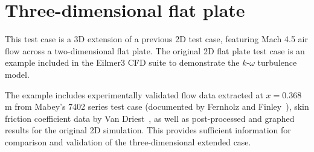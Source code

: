 \newpage
\section{Three-dimensional flat plate}
\label{chapter-3Dflatplate}
%
This test case is a 3D extension of a previous 2D test case, featuring Mach 4.5 air flow across a two-dimensional flat plate. The original 2D flat plate test case is an example included in the Eilmer3 CFD suite to demonstrate the $k$-$\omega$ turbulence model. 

The example includes experimentally validated flow data extracted at $x=0.368$\,m from Mabey's 7402 series test case (documented by Fernholz and Finley~\cite{Fernholz1977}), skin friction coefficient data by Van Driest~\cite{vanDriest1956}, as well as post-processed and graphed results for the original 2D simulation. This provides sufficient information for comparison and validation of the three-dimensional extended case. 
